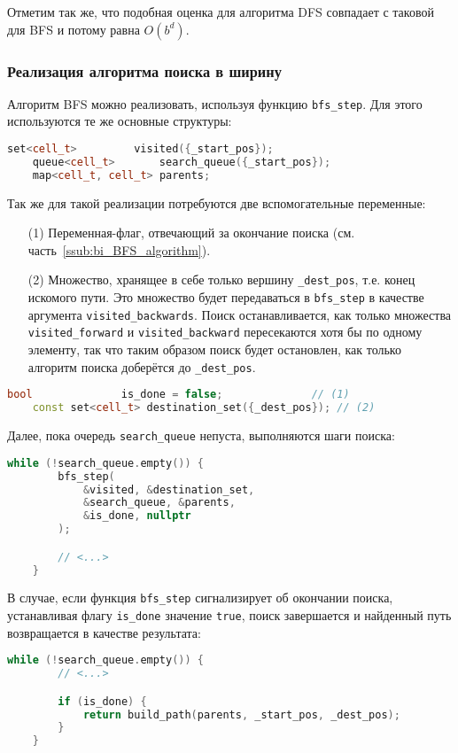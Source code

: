 \documentclass[a4paper, 12pt]{article}
\begin{document}
Отметим так же, что подобная оценка для алгоритма DFS совпадает с таковой для BFS и потому равна \({ O(b^{d}) }\).

\subsubsection{Реализация алгоритма поиска в ширину}
\label{ssub:BFS_implementation}
Алгоритм BFS можно реализовать, используя функцию \verb|bfs_step|. Для этого используются те же основные структуры:
\begin{lstlisting}[language=C++]
    set<cell_t>         visited({_start_pos});
    queue<cell_t>       search_queue({_start_pos});
    map<cell_t, cell_t> parents;
\end{lstlisting}

Так же для такой реализации потребуются две вспомогательные переменные:
\begin{itemize}
    \item[(1)] Переменная-флаг, отвечающий за окончание поиска (см. часть~\ref{ssub:bi_BFS_algorithm}).
    \item[(2)] Множество, хранящее в себе только вершину \verb|_dest_pos|, т.е. конец искомого пути. Это множество будет передаваться в \verb|bfs_step| в качестве аргумента \verb|visited_backwards|. Поиск останавливается, как только множества \verb|visited_forward| и \verb|visited_backward| пересекаются хотя бы по одному элементу,  так что таким образом поиск будет остановлен, как только алгоритм поиска доберётся до \verb|_dest_pos|.
\end{itemize}
\begin{lstlisting}[language=C++]
    bool              is_done = false;              // (1)
    const set<cell_t> destination_set({_dest_pos}); // (2)
\end{lstlisting}

Далее, пока очередь \verb|search_queue| непуста, выполняются шаги поиска:
\begin{lstlisting}[language=C++]
    while (!search_queue.empty()) {
        bfs_step(
            &visited, &destination_set,
            &search_queue, &parents,
            &is_done, nullptr
        );

        // <...>
    }
\end{lstlisting}

В случае, если функция \verb|bfs_step| сигнализирует об окончании поиска, устанавливая флагу \verb|is_done| значение \verb|true|, поиск завершается и найденный путь возвращается в качестве результата:
\begin{lstlisting}[language=C++]
    while (!search_queue.empty()) {
        // <...>

        if (is_done) {
            return build_path(parents, _start_pos, _dest_pos);
        }
    }
\end{lstlisting}
\end{document}
